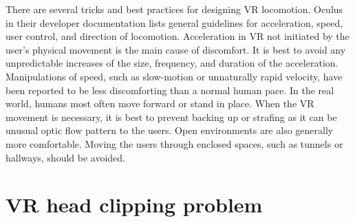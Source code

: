 There are several tricks and best practices for designing VR locomotion. Oculus in their developer documentation \cite{OCULUSDOC} lists general guidelines for acceleration, speed, user control, and direction of locomotion. Acceleration in VR not initiated by the user's physical movement is the main cause of discomfort. It is best to avoid any unpredictable increases of the size, frequency, and duration of the acceleration. Manipulations of speed, such as slow-motion or unnaturally rapid velocity, have been reported to be less discomforting than a normal human pace. In the real world, humans most often move forward or stand in place. When the VR movement is necessary, it is best to prevent backing up or strafing as it can be unusual optic flow pattern to the users. Open environments are also generally more comfortable. Moving the users through enclosed spaces, such as tunnels or hallways, should be avoided.

\section{VR head clipping problem}


